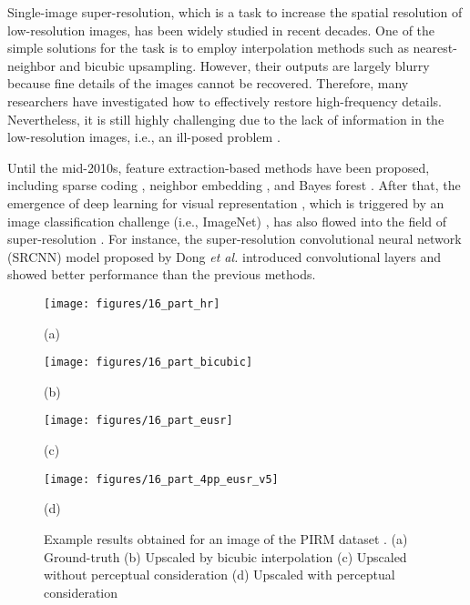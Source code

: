 \documentclass[runningheads]{llncs}
\begin{document}
Single-image super-resolution, which is a task to increase the spatial resolution of low-resolution images, has been widely studied in recent decades.
One of the simple solutions for the task is to employ interpolation methods such as nearest-neighbor and bicubic upsampling.
However, their outputs are largely blurry because fine details of the images cannot be recovered.
Therefore, many researchers have investigated how to effectively restore high-frequency details.
Nevertheless, it is still highly challenging due to the lack of information in the low-resolution images, i.e., an ill-posed problem \cite{ledig2017photo}.

Until the mid-2010s, feature extraction-based methods have been proposed, including sparse coding \cite{yang2011multitask}, neighbor embedding \cite{li2014single}, and Bayes forest \cite{salvador2015naive}.
After that, the emergence of deep learning for visual representation \cite{guo2016deep}, which is triggered by an image classification challenge (i.e., ImageNet) \cite{krizhevsky2012imagenet}, has also flowed into the field of super-resolution \cite{yang2018deep}.
For instance, the super-resolution convolutional neural network (SRCNN) model proposed by Dong \textit{et al.} \cite{dong2014learning} introduced convolutional layers and showed better performance than the previous methods.

\begin{figure*}[t]
	\centering
	\begin{minipage}[b]{0.24\linewidth}
		\centering
		\centerline{\texttt{[image: figures/16\_part\_hr]}}
		\centerline{(a)}
	\end{minipage}
	\begin{minipage}[b]{0.24\linewidth}
		\centering
		\centerline{\texttt{[image: figures/16\_part\_bicubic]}}
		\centerline{(b)}
	\end{minipage}
	\begin{minipage}[b]{0.24\linewidth}
		\centering
		\centerline{\texttt{[image: figures/16\_part\_eusr]}}
		\centerline{(c)}
	\end{minipage}
	\begin{minipage}[b]{0.24\linewidth}
		\centering
		\centerline{\texttt{[image: figures/16\_part\_4pp\_eusr\_v5]}}
		\centerline{(d)}
	\end{minipage}
	\caption{Example results obtained for an image of the PIRM dataset \cite{pirm2018sr}. (a) Ground-truth (b) Upscaled by bicubic interpolation (c) Upscaled without perceptual consideration (d) Upscaled with perceptual consideration}
	\label{fig:example_result}
\end{figure*}
\end{document}
